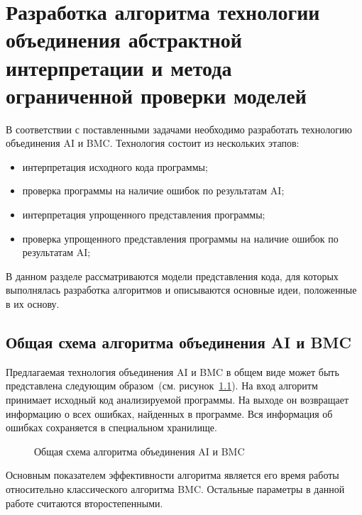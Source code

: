 \chapter{Разработка алгоритма технологии объединения абстрактной интерпретации 
и метода ограниченной проверки моделей}
\label{chapter:algorithm}
В соответствии с поставленными задачами необходимо разработать технологию
объединения AI и BMC. Технология состоит из нескольких этапов:
\begin{itemize}
\item интерпретация исходного кода программы;
\item проверка программы на наличие ошибок по результатам AI;
\item интерпретация упрощенного представления программы;
\item проверка упрощенного представления программы на наличие ошибок по 
результатам AI;
\end{itemize}

В данном разделе рассматриваются модели представления кода, для которых 
выполнялась разработка алгоритмов и описываются основные идеи, положенные в их
основу.

\section{Общая схема алгоритма объединения AI и BMC}
Предлагаемая технология объединения AI и BMC в общем виде может быть 
представлена следующим образом~(см. рисунок~\ref{image:algorithmOverview}). На
вход алгоритм принимает исходный код анализируемой программы. На выходе он 
возвращает информацию о всех ошибках, найденных в программе. Вся информация
об ошибках сохраняется в специальном хранилище.

\begin{figure}[h!]
\caption{Общая схема алгоритма объединения AI и BMC}
\label{image:algorithmOverview}
\end{figure}

Основным показателем эффективности алгоритма является его время работы 
относительно классического алгоритма BMC. Остальные параметры в данной работе
считаются второстепенными.

